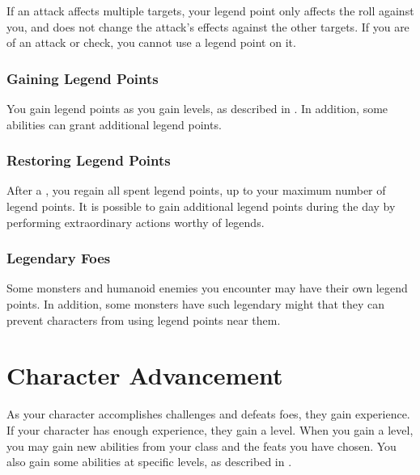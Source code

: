             If an attack affects multiple targets, your legend point only affects the roll against you, and does not change the attack's effects against the other targets.
            If you are  of an attack or check, you cannot use a legend point on it.

        \subsubsection{Gaining Legend Points}

            You gain legend points as you gain levels, as described in .
            In addition, some abilities can grant additional legend points.

        \subsubsection{Restoring Legend Points}

            After a , you regain all spent legend points, up to your maximum number of legend points.
            It is possible to gain additional legend points during the day by performing extraordinary actions worthy of legends.

        \subsubsection{Legendary Foes}
            Some monsters and humanoid enemies you encounter may have their own legend points.
            In addition, some monsters have such legendary might that they can prevent characters from using legend points near them.

\section{Character Advancement}\label{Character Advancement}

    As your character accomplishes challenges and defeats foes, they gain experience.
    If your character has enough experience, they gain a level.
    When you gain a level, you may gain new abilities from your class and the feats you have chosen.
    You also gain some abilities at specific levels, as described in .

